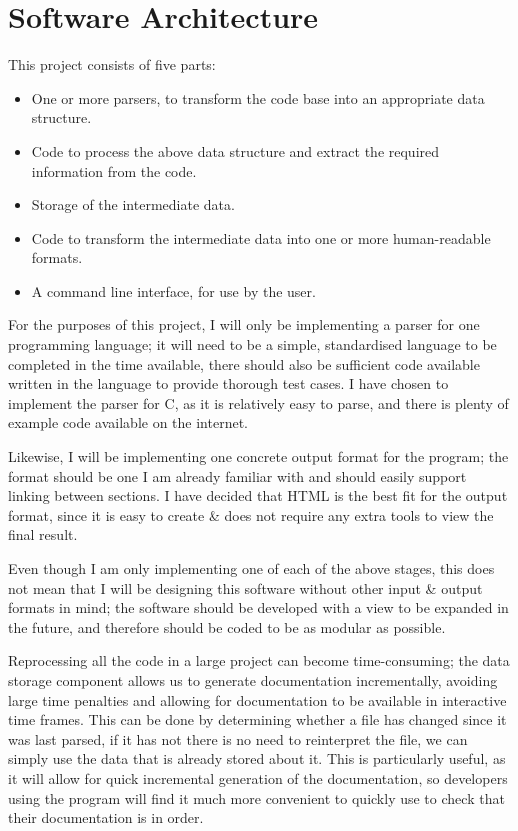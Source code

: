 \section{Software Architecture}
This project consists of five parts:
\begin{itemize}
  \item One or more parsers, to transform the code base into an appropriate data
    structure.
  \item Code to process the above data structure and extract the required
    information from the code.
  \item Storage of the intermediate data.
  \item Code to transform the intermediate data into one or more human-readable
    formats.
  \item A command line interface, for use by the user.
\end{itemize}

For the purposes of this project, I will only be implementing a parser for one
programming language; it will need to be a simple, standardised language to be
completed in the time available, there should also be sufficient code available
written in the language to provide thorough test cases. I have chosen to
implement the parser for C, as it is relatively easy to parse, and there is
plenty of example code available on the internet.

Likewise, I will be implementing one concrete output format for the program; the
format should be one I am already familiar with and should easily support
linking between sections. I have decided that HTML is the best fit for the
output format, since it is easy to create \& does not require any extra tools to
view the final result.

Even though I am only implementing one of each of the above stages, this does
not mean that I will be designing this software without other input \& output
formats in mind; the software should be developed with a view to be expanded in
the future, and therefore should be coded to be as modular as possible.

Reprocessing all the code in a large project can become time-consuming; the data
storage component allows us to generate documentation incrementally, avoiding
large time penalties and allowing for documentation to be available in
interactive time frames. This can be done by determining whether a file has
changed since it was last parsed, if it has not there is no need to reinterpret
the file, we can simply use the data that is already stored about it. This is
particularly useful, as it will allow for quick incremental generation of the
documentation, so developers using the program will find it much more convenient
to quickly use to check that their documentation is in order.

